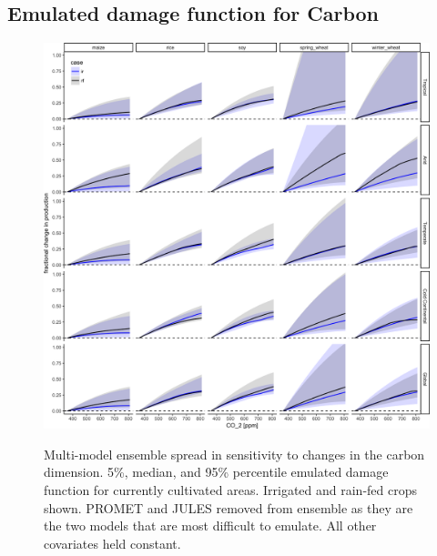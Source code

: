 \documentclass[10pt]{article}
\begin{document}
\subsection{Emulated damage function for Carbon}
\begin{figure}[h!]
\includegraphics[width=\textwidth]{s_carbon.png}\\
\caption{Multi-model ensemble spread in sensitivity to changes in the carbon dimension.  5\%, median,  and 95\% percentile emulated damage function for currently cultivated areas. Irrigated and rain-fed crops shown. PROMET and JULES removed from ensemble as they are the two models that are most difficult to emulate. All other covariates held constant.}
\label{fig:carbon}
\end{figure}
\clearpage
\end{document}

